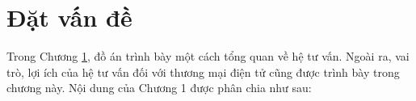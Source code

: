 \chapter{Đặt vấn đề}
\label{chap1}

Trong Chương \ref{chap1}, đồ án trình bày một cách tổng quan về hệ tư vấn. Ngoài ra, vai trò,
lợi ích của hệ tư vấn đối với thương mại điện tử cũng được trình bày trong chương này.
Nội dung của Chương 1 được phân chia như sau: